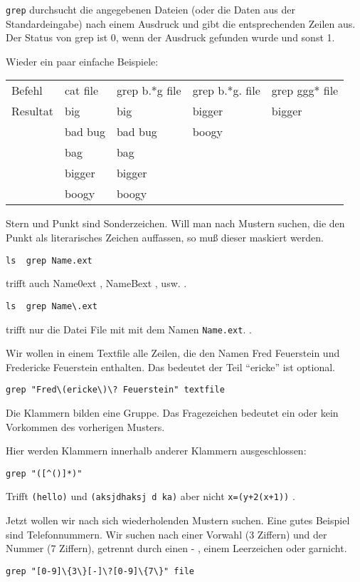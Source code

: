 \documentclass[12pt,]{article}
\begin{document}
\texttt{grep} durchsucht die angegebenen Dateien (oder die Daten aus der
Standardeingabe) nach einem Ausdruck und gibt die entsprechenden Zeilen
aus. Der Status von grep ist 0, wenn der Ausdruck gefunden wurde und
sonst 1.

Wieder ein paar einfache Beispiele:

\begin{longtable}[c]{@{}lllll@{}}
\toprule
Befehl & cat file & grep b.*g file & grep b.*g. file & grep ggg*
file\tabularnewline
Resultat & big & big & bigger & bigger\tabularnewline
~ & bad bug & bad bug & boogy & ~\tabularnewline
~ & bag & bag & ~ & ~\tabularnewline
~ & bigger & bigger & ~ & ~\tabularnewline
~ & boogy & boogy & ~ & ~\tabularnewline
\bottomrule
\end{longtable}

Stern und Punkt sind Sonderzeichen. Will man nach Mustern suchen, die
den Punkt als literarisches Zeichen auffassen, so muß dieser maskiert
werden.

\texttt{ls\ \textbar{}\ grep\ Name.ext}

trifft auch Name0ext , NameBext , usw. .

\texttt{ls\ \textbar{}\ grep\ Name\textbackslash{}.ext}

trifft nur die Datei File mit mit dem Namen \texttt{Name.ext}. .

Wir wollen in einem Textfile alle Zeilen, die den Namen Fred Feuerstein
und Fredericke Feuerstein enthalten. Das bedeutet der Teil ``ericke''
ist optional.

\texttt{grep\ "Fred\textbackslash{}(ericke\textbackslash{})\textbackslash{}?\ Feuerstein"\ textfile}

Die Klammern bilden eine Gruppe. Das Fragezeichen bedeutet ein oder kein
Vorkommen des vorherigen Musters.

Hier werden Klammern innerhalb anderer Klammern ausgeschlossen:

\texttt{grep\ "({[}\^{}(){]}*)"}

Trifft \texttt{(hello)} und \texttt{(aksjdhaksj\ d\ ka)} aber nicht
\texttt{x=(y+2(x+1))} .

Jetzt wollen wir nach sich wiederholenden Mustern suchen. Eine gutes
Beispiel sind Telefonnummern. Wir suchen nach einer Vorwahl (3 Ziffern)
und der Nummer (7 Ziffern), getrennt durch einen - , einem Leerzeichen
oder garnicht.

\texttt{grep\ "{[}0-9{]}\textbackslash{}\{3\textbackslash{}\}{[}-{]}\textbackslash{}?{[}0-9{]}\textbackslash{}\{7\textbackslash{}\}"\ file}
\end{document}
